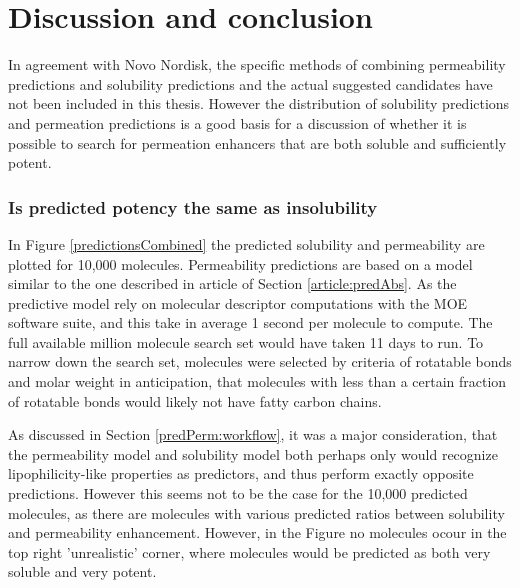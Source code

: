 \chapter{Discussion and conclusion}

In agreement with Novo Nordisk, the specific methods of combining permeability predictions and solubility predictions and the actual suggested candidates have not been included in this thesis. However the distribution of solubility predictions and permeation predictions is a good basis for a discussion of whether it is possible to search for permeation enhancers that are both soluble and sufficiently potent.

\subsection{Is predicted potency the same as insolubility}
In Figure \ref{predictionsCombined} the predicted solubility and permeability are plotted for 10,000 molecules. Permeability predictions are based on a model similar to the one described in article of Section \ref{article:predAbs}. As the predictive model rely on molecular descriptor computations with the MOE software suite, and this take in average 1 second per molecule to compute. The full available million molecule search set would have taken 11 days to run. To narrow down the search set, molecules were selected by criteria of rotatable bonds and molar weight in anticipation, that molecules with less than a certain fraction of rotatable bonds would likely not have fatty carbon chains.

As discussed in Section \ref{predPerm:workflow}, it was a major consideration, that the permeability model and solubility model both perhaps only would recognize lipophilicity-like properties as predictors, and thus perform exactly opposite predictions. However this seems not to be the case for the 10,000 predicted molecules, as there are molecules with various predicted ratios between solubility and permeability enhancement. However, in the Figure no molecules ocour in the top right 'unrealistic' corner, where molecules would be predicted as both very soluble and very potent.

